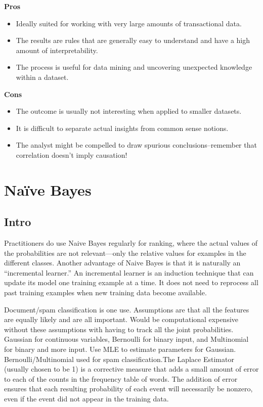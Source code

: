 \documentclass[]{book}
\theoremstyle{definition}
\theoremstyle{definition}
\theoremstyle{definition}
\theoremstyle{remark}
\begin{document}
\textbf{Pros}

\begin{itemize}
\item
  Ideally suited for working with very large amounts of transactional
  data.
\item
  The results are rules that are generally easy to understand and have a
  high amount of interpretability.
\item
  The process is useful for data mining and uncovering unexpected
  knowledge within a dataset.
\end{itemize}

\textbf{Cons}

\begin{itemize}
\item
  The outcome is usually not interesting when applied to smaller
  datasets.
\item
  It is difficult to separate actual insights from common sense notions.
\item
  The analyst might be compelled to draw spurious conclusions--remember
  that correlation doesn't imply causation!
\end{itemize}

\section{Naïve Bayes}\label{naive-bayes}

\subsection{Intro}\label{intro-15}

Practitioners do use Naive Bayes regularly for ranking, where the actual
values of the probabilities are not relevant---only the relative values
for examples in the different classes. Another advantage of Naive Bayes
is that it is naturally an ``incremental learner.'' An incremental
learner is an induction technique that can update its model one training
example at a time. It does not need to reprocess all past training
examples when new training data become available.

Document/spam classification is one use. Assumptions are that all the
features are equally likely and are all important. Would be
computational expensive without these assumptions with having to track
all the joint probabilities. Gaussian for continuous variables,
Bernoulli for binary input, and Multinomial for binary and more input.
Use MLE to estimate parameters for Gaussian. Bernoulli/Multinomial used
for spam classification.The Laplace Estimator (usually chosen to be 1)
is a corrective measure that adds a small amount of error to each of the
counts in the frequency table of words. The addition of error ensures
that each resulting probability of each event will necessarily be
nonzero, even if the event did not appear in the training data.
\end{document}
